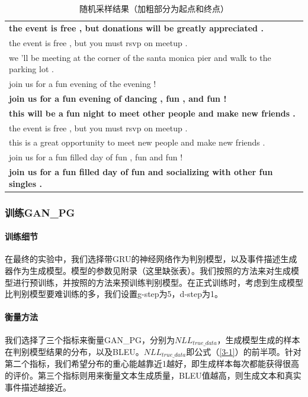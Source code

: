 \documentclass[]{template}
\begin{document}
\begin{table}[htbp]
    \center
    \caption{\label{t3-3}随机采样结果（加粗部分为起点和终点）}
    \begin{tabular*}{\linewidth}{p{\linewidth}}
\toprule
\textbf{the event is free , but donations will be greatly appreciated .}\\
the event is free , but you must rsvp on meetup . \\
we 'll be meeting at the corner of the santa monica pier and walk to the parking lot .\\
join us for a fun evening of the evening !\\
\textbf{join us for a fun evening of dancing , fun , and fun !}\\
\midrule
\textbf{this will be a fun night to meet other people and make new friends .}\\
the event is free , but you must rsvp on meetup . \\
this is a great opportunity to meet new people and make new friends .\\
join us for a fun filled day of fun , fun and fun ! \\
\textbf{join us for a fun filled day of fun and socializing with other fun singles . }\\
\bottomrule
    \end{tabular*}
\end{table}

\subsubsection{训练GAN\_PG}
\paragraph{训练细节}
在最终的实验中，我们选择带GRU的神经网络作为判别模型，以及事件描述生成器作为生成模型。模型的参数见附录（这里缺张表）。我们按照\cite{train_generator}的方法来对生成模型进行预训练，并按照\cite{train_discrimitor}的方法来预训练判别模型。在正式训练时，考虑到生成模型比判别模型要难训练的多，我们设置g-step为5，d-step为1。
\paragraph{衡量方法}
我们选择了三个指标来衡量GAN\_PG，分别为$NLL_{true\_data}$，生成模型生成的样本在判别模型结果的分布，以及BLEU\cite{papineni_bleu:_2002}。$NLL_{true\_data}$即公式（\ref{3-1}）的前半项。针对第二个指标，我们希望分布的重心能越靠近1越好，即生成样本每次都能获得很高的评价。第三个指标则用来衡量文本生成质量，BLEU值越高，则生成文本和真实事件描述越接近。
\end{document}
